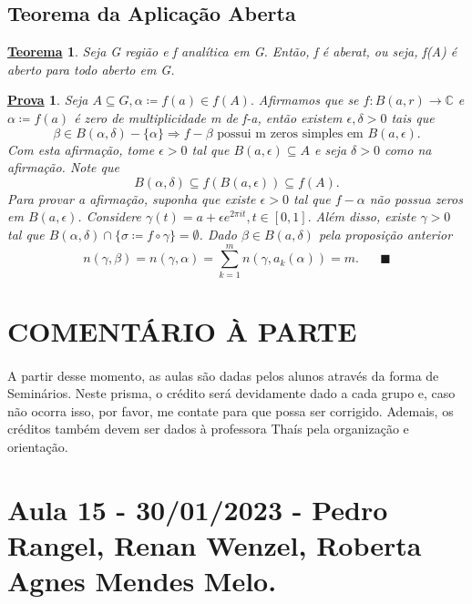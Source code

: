 \documentclass{article}
\newtheorem*{theorem*}{\underline{Teorema}}
\newtheorem*{proof*}{\underline{Prova}}
\renewcommand\qedsymbol{$\blacksquare$}
\begin{document}
  \subsection{Teorema da Aplica\c c\~ao Aberta}
  \begin{theorem*}
    Seja G regi\~ao e f anal\'itica em G. Ent\~ao, f \'e aberat, ou seja, f(A) \'e aberto para todo aberto em G. 
  \end{theorem*}
  \begin{proof*}
    Seja $A\subseteq{G}, \alpha\coloneqq f(a)\in{f(A)}.$ Afirmamos que se $f:B(a, r)\rightarrow \mathbb{C}$ e $\alpha\coloneqq f(a)$ \'e zero de 
    multiplicidade m de f-a, ent\~ao existem $\epsilon, \delta > 0$ tais que 
    $$
    \beta\in{B(\alpha, \delta)- \{\alpha\} }\Rightarrow f-\beta\text{ possui m zeros simples em }B(a, \epsilon).
    $$
    Com esta afirma\c c\~ao, tome $\epsilon > 0$ tal que $B(a, \epsilon)\subseteq{A}$ e seja $\delta > 0$ como na afirma\c c\~ao.
    Note que
    $$
    B(\alpha, \delta)\subseteq{f(B(a, \epsilon))}\subseteq{f(A)}.
    $$
    Para provar a afirma\c c\~ao, suponha que existe $\epsilon > 0$ tal que $f - \alpha$ n\~ao possua zeros em $B(a, \epsilon)$. Considere
    $\gamma(t) = a + \epsilon e^{2\pi it}, t\in[0, 1].$ Al\'em disso, existe $\gamma > 0$ tal que $B(\alpha, \delta)\cap \{\sigma\coloneqq f\circ{\gamma}\}=\emptyset$.
    Dado $\beta\in{B(a, \delta)}$ pela proposi\c c\~ao anterior
    $$
    n(\gamma, \beta) = n(\gamma, \alpha) = \sum\limits_{k=1}^{m}n(\gamma, a_{k}(\alpha)) = m.\quad\text{ \qedsymbol}
    $$
  \end{proof*}
  \newpage
  \section*{COMENT\'ARIO \`A PARTE}

  \paragraph{}  A partir desse momento, as aulas s\~ao dadas pelos alunos atrav\'es da forma de Semin\'arios. Neste prisma, o cr\'edito ser\'a
  devidamente dado a cada grupo e, caso n\~ao ocorra isso, por favor, me contate para que possa ser corrigido. Ademais, os cr\'editos
  tamb\'em devem ser dados \`a professora Tha\'is pela organiza\c c\~ao e orienta\c c\~ao.
  \newpage

  \section{Aula 15 - 30/01/2023 - Pedro Rangel, Renan Wenzel, Roberta Agnes Mendes Melo.}
\end{document}

